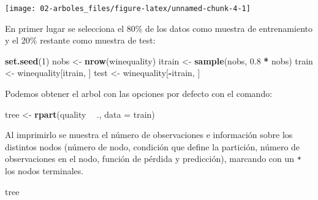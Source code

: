 \documentclass[
  spanish,
]{book}
\newenvironment{Shaded}{\begin{snugshade}}{\end{snugshade}}
\newcommand{\DataTypeTok}[1]{\textcolor[rgb]{0.13,0.29,0.53}{#1}}
\newcommand{\DecValTok}[1]{\textcolor[rgb]{0.00,0.00,0.81}{#1}}
\newcommand{\FloatTok}[1]{\textcolor[rgb]{0.00,0.00,0.81}{#1}}
\newcommand{\KeywordTok}[1]{\textcolor[rgb]{0.13,0.29,0.53}{\textbf{#1}}}
\newcommand{\NormalTok}[1]{#1}
\newcommand{\OperatorTok}[1]{\textcolor[rgb]{0.81,0.36,0.00}{\textbf{#1}}}
\newcommand{\StringTok}[1]{\textcolor[rgb]{0.31,0.60,0.02}{#1}}
\theoremstyle{break}
\theoremstyle{definition}
\theoremstyle{definition}
\theoremstyle{definition}
\theoremstyle{remark}
\begin{document}
\begin{Shaded}
\end{Shaded}

\begin{center}\texttt{[image: 02-arboles\_files/figure-latex/unnamed-chunk-4-1]} \end{center}

En primer lugar se selecciona el 80\% de los datos como muestra de entrenamiento y el 20\% restante como muestra de test:

\begin{Shaded}
\begin{Highlighting}[]
\KeywordTok{set.seed}\NormalTok{(}\DecValTok{1}\NormalTok{)}
\NormalTok{nobs <-}\StringTok{ }\KeywordTok{nrow}\NormalTok{(winequality)}
\NormalTok{itrain <-}\StringTok{ }\KeywordTok{sample}\NormalTok{(nobs, }\FloatTok{0.8} \OperatorTok{*}\StringTok{ }\NormalTok{nobs)}
\NormalTok{train <-}\StringTok{ }\NormalTok{winequality[itrain, ]}
\NormalTok{test <-}\StringTok{ }\NormalTok{winequality[}\OperatorTok{-}\NormalTok{itrain, ]}
\end{Highlighting}
\end{Shaded}

Podemos obtener el arbol con las opciones por defecto con el comando:

\begin{Shaded}
\begin{Highlighting}[]
\NormalTok{tree <-}\StringTok{ }\KeywordTok{rpart}\NormalTok{(quality }\OperatorTok{~}\StringTok{ }\NormalTok{., }\DataTypeTok{data =}\NormalTok{ train)}
\end{Highlighting}
\end{Shaded}

Al imprimirlo se muestra el número de observaciones e información
sobre los distintos nodos (número de nodo, condición que define la partición,
número de observaciones en el nodo, función de pérdida y predicción),
marcando con un \texttt{*} los nodos terminales.

\begin{Shaded}
\begin{Highlighting}[]
\NormalTok{tree}
\end{Highlighting}
\end{Shaded}
\end{document}
